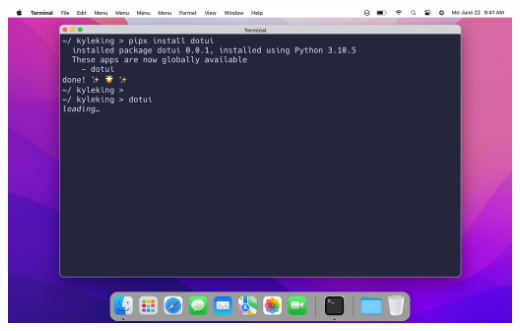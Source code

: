 \documentclass[letterpaper]{jdf}
\begin{document}
\begin{jdffigure}
\includegraphics{./Prototype/Card01-Install.png}
\label{fig:Card01}
\end{jdffigure}

\begin{jdffigure}
\label{fig:Card02}
\end{jdffigure}

\begin{jdffigure}
\label{fig:Card03}
\end{jdffigure}
\end{document}
